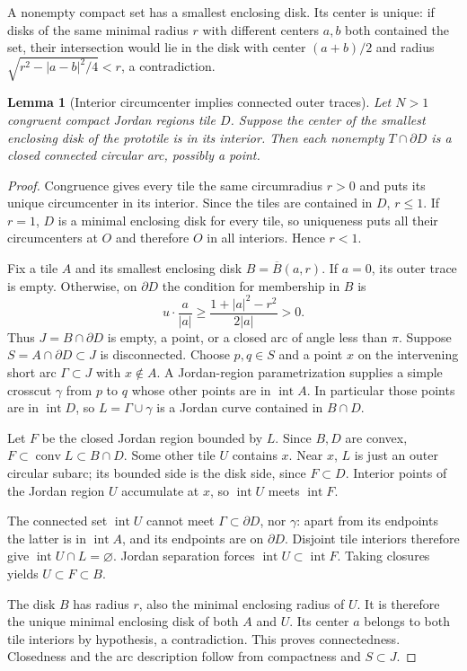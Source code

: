 \documentclass[11pt]{article}
\newtheorem{lemma}[theorem]{Lemma}
\newcommand{\interior}{\operatorname{int}}
\newcommand{\conv}{\operatorname{conv}}
\begin{document}
A nonempty compact set has a smallest enclosing disk. Its center is unique:
if disks of the same minimal radius $r$ with different centers $a,b$ both
contained the set, their intersection would lie in the disk with center
$(a+b)/2$ and radius $\sqrt{r^2-|a-b|^2/4}<r$, a contradiction.

\begin{lemma}[Interior circumcenter implies connected outer traces]
\label{lem:circumtrace}
Let $N>1$ congruent compact Jordan regions tile $D$. Suppose the center of
the smallest enclosing disk of the prototile is in its interior. Then each
nonempty $T\cap\partial D$ is a closed connected circular arc, possibly a point.
\end{lemma}

\begin{proof}
Congruence gives every tile the same circumradius $r>0$ and puts its unique
circumcenter in its interior. Since the tiles are contained in $D$, $r\leq1$.
If $r=1$, $D$ is a minimal enclosing disk for every tile, so uniqueness puts
all their circumcenters at $O$ and therefore $O$ in all interiors. Hence $r<1$.

Fix a tile $A$ and its smallest enclosing disk $B=\overline B(a,r)$.
If $a=0$, its outer trace is empty. Otherwise, on $\partial D$ the condition
for membership in $B$ is
\[
 u\cdot\frac{a}{|a|}\geq\frac{1+|a|^2-r^2}{2|a|}>0.
\]
Thus $J=B\cap\partial D$ is empty, a point, or a closed arc of angle less
than $\pi$. Suppose $S=A\cap\partial D\subset J$ is disconnected. Choose
$p,q\in S$ and a point $x$ on the intervening short arc
$\Gamma\subset J$ with $x\notin A$. A Jordan-region parametrization supplies
a simple crosscut $\gamma$ from $p$ to $q$ whose other points are in
$\interior A$. In particular those points are in $\interior D$, so
$L=\Gamma\cup\gamma$ is a Jordan curve contained in $B\cap D$.

Let $F$ be the closed Jordan region bounded by $L$. Since $B,D$ are convex,
$F\subset\conv L\subset B\cap D$. Some other tile $U$ contains $x$.
Near $x$, $L$ is just an outer circular subarc; its bounded side is the
disk side, since $F\subset D$. Interior points of the Jordan region $U$
accumulate at $x$, so $\interior U$ meets $\interior F$.

The connected set $\interior U$ cannot meet $\Gamma\subset\partial D$,
nor $\gamma$: apart from its endpoints the latter is in $\interior A$,
and its endpoints are on $\partial D$. Disjoint tile interiors therefore
give $\interior U\cap L=\varnothing$. Jordan separation forces
$\interior U\subset\interior F$. Taking closures yields $U\subset F\subset B$.

The disk $B$ has radius $r$, also the minimal enclosing radius of $U$.
It is therefore the unique minimal enclosing disk of both $A$ and $U$.
Its center $a$ belongs to both tile interiors by hypothesis, a contradiction.
This proves connectedness. Closedness and the arc description follow from
compactness and $S\subset J$.
\end{proof}
\end{document}
